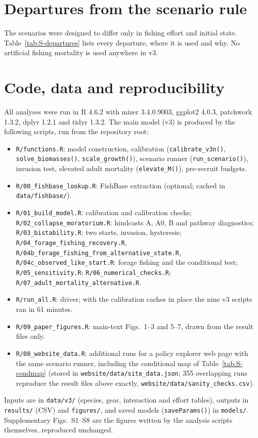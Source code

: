 \documentclass[11pt,letterpaper,fleqn]{article}
\begin{document}
\section{Departures from the scenario rule}\label{sec:S-departures}

The scenarios were designed to differ only in fishing effort and initial state. Table~\ref{tab:S-departures} lists every departure, where it is used and why. No artificial fishing mortality is used anywhere in v3.

\section{Code, data and reproducibility}\label{sec:S-code}

All analyses were run in R 4.6.2 with mizer 3.4.0.9003, ggplot2 4.0.3, patchwork 1.3.2, dplyr 1.2.1 and tidyr 1.3.2. The main model (v3) is produced by the following scripts, run from the repository root:
\begin{itemize}\setlength{\itemsep}{0pt}
\item \nolinkurl{R/functions.R}: model construction, calibration (\texttt{calibrate\_v3n()}, \texttt{solve\_biomasses()}, \texttt{scale\_growth()}), scenario runner (\texttt{run\_scenario()}), invasion test, elevated adult mortality (\texttt{elevate\_M()}), pre-recruit budgets.
\item \nolinkurl{R/00_fishbase_lookup.R}: FishBase extraction (optional; cached in \nolinkurl{data/fishbase/}).
\item \nolinkurl{R/01_build_model.R}: calibration and calibration checks; \nolinkurl{R/02_collapse_moratorium.R}: hindcasts A, A0, B and pathway diagnostics; \nolinkurl{R/03_bistability.R}: two starts, invasion, hysteresis; \nolinkurl{R/04_forage_fishing_recovery.R}, \nolinkurl{R/04b_forage_fishing_from_alternative_state.R}, \nolinkurl{R/04c_observed_like_start.R}: forage fishing and the conditional test; \nolinkurl{R/05_sensitivity.R}; \nolinkurl{R/06_numerical_checks.R}; \nolinkurl{R/07_adult_mortality_alternative.R}.
\item \nolinkurl{R/run_all.R}: driver; with the calibration caches in place the nine v3 scripts ran in 61 minutes.
\item \nolinkurl{R/09_paper_figures.R}: main-text Figs.~1--3 and 5--7, drawn from the result files only.
\item \nolinkurl{R/08_website_data.R}: additional runs for a policy explorer web page with the same scenario runner, including the conditional map of Table~\ref{tab:S-condmap} (stored in \nolinkurl{website/data/site_data.json}; 355 overlapping runs reproduce the result files above exactly, \nolinkurl{website/data/sanity_checks.csv}).
\end{itemize}
Inputs are in \nolinkurl{data/v3/} (species, gear, interaction and effort tables), outputs in \nolinkurl{results/} (CSV) and \nolinkurl{figures/}, and saved models (\texttt{saveParams()}) in \nolinkurl{models/}. Supplementary Figs.~S1--S8 are the figures written by the analysis scripts themselves, reproduced unchanged.
\end{document}

